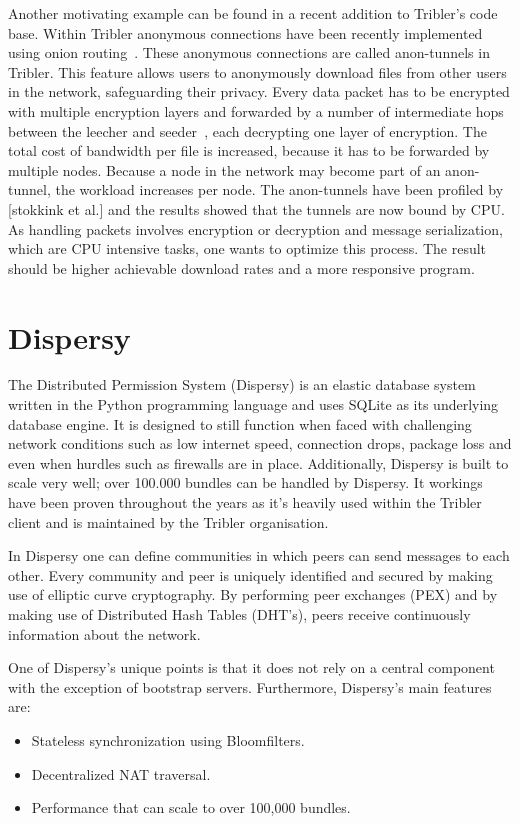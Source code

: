 Another motivating example can be found in a recent addition to Tribler's code base.
Within Tribler anonymous connections have been recently implemented using onion routing~\cite{Plak-anonymous,ruigrok-anonymous,tanaskoski-anonymous}.
These anonymous connections are called anon-tunnels in Tribler.
This feature allows users to anonymously download files from other users in the network, safeguarding their privacy.
Every data packet has to be encrypted with multiple encryption layers and forwarded by a number of intermediate hops between the leecher and seeder~\cite{Plak-anonymous,tanaskoski-anonymous}, each decrypting one layer of encryption.
The total cost of bandwidth per file is increased, because it has to be forwarded by multiple nodes.
Because a node in the network may become part of an anon-tunnel, the workload increases per node.
The anon-tunnels have been profiled by [stokkink et al.]  and the results showed that the tunnels are now bound by CPU.
As handling packets involves encryption or decryption and message serialization, which are CPU intensive tasks, one wants to optimize this process.
The result should be higher achievable download rates and a more responsive program.

\section{Dispersy}
The Distributed Permission System (Dispersy) is an elastic database system written in the Python programming language and uses SQLite as its underlying database engine.
It is designed to still function when faced with challenging network conditions such as low internet speed, connection drops, package loss and even when hurdles such as firewalls are in place.
Additionally, Dispersy is built to scale very well; over 100.000 bundles can be handled by Dispersy.
It workings have been proven throughout the years as it's heavily used within the Tribler client and is maintained by the Tribler organisation.

In Dispersy one can define communities in which peers can send messages to each other.
Every community and peer is uniquely identified and secured by making use of elliptic curve cryptography.
By performing peer exchanges (PEX) and by making use of Distributed Hash Tables (DHT's), peers receive continuously information about the network.

One of Dispersy's unique points is that it does not rely on a central component with the exception of bootstrap servers.
Furthermore, Dispersy's main features are:
\begin{itemize}
	\item Stateless synchronization using Bloomfilters.
	\item Decentralized NAT traversal.
	\item Performance that can scale to over 100,000 bundles.
\end{itemize}


